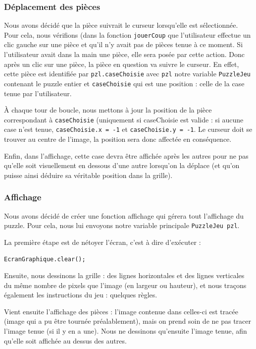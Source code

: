 \documentclass[]{article}
\newcommand{\variable}[1]{\noindent \texttt{#1}}
\begin{document}
\subsubsection{Déplacement des pièces}

Nous avons décidé que la pièce suivrait le curseur lorsqu'elle est sélectionnée. Pour cela, nous vérifions (dans la fonction \variable{jouerCoup} que l'utilisateur effectue un clic gauche sur une pièce et qu'il n'y avait pas de pièces tenue à ce moment. Si l'utilisateur avait dans la main une pièce, elle sera posée par cette action. Donc après un clic sur une pièce, la pièce en question va suivre le curseur. En effet, cette pièce est identifiée par \variable{pzl.caseChoisie} avec \variable{pzl} notre variable \variable{PuzzleJeu} contenant le puzzle entier et \variable{caseChoisie} qui est une position : celle de la case tenue par l'utilisateur.

À chaque tour de boucle, nous mettons à jour la position de la pièce correspondant à \variable{caseChoisie} (uniquement si caseChoisie est valide : si aucune case n'est tenue, \variable{caseChoisie.x = -1} et \variable{caseChoisie.y = -1}. Le curseur doit se trouver au centre de l'image, la position sera donc affectée en conséquence.

Enfin, dans l'affichage, cette case devra être affichée après les autres pour ne pas qu'elle soit visuellement en dessous d'une autre lorsqu'on la déplace (et qu'on puisse ainsi déduire sa véritable position dans la grille).

\subsubsection{Affichage}

Nous avons décidé de créer une fonction affichage qui gérera tout l'affichage du puzzle. Pour cela, nous lui envoyons notre variable principale \variable{PuzzleJeu pzl}.

La première étape est de nétoyer l'écran, c'est à dire d'exécuter : 
\begin{lstlisting}
EcranGraphique.clear();
\end{lstlisting}

Ensuite, nous dessinons la grille : des lignes horizontales et des lignes verticales du même nombre de pixels que l'image (en largeur ou hauteur), et nous traçons également les instructions du jeu : quelques règles.

Vient ensuite l'affichage des pièces : l'image contenue dans celles-ci est tracée (image qui a pu être tournée préalablement), mais on prend soin de ne pas tracer l'image tenue (si il y en a une). Nous ne dessinons qu'ensuite l'image tenue, afin qu'elle soit affichée au dessus des autres.
\end{document}
